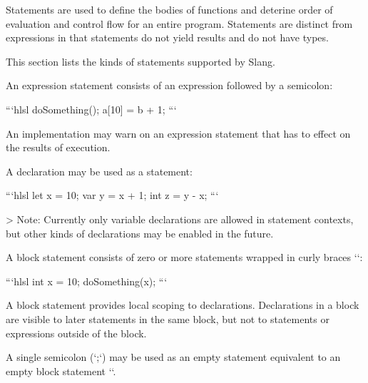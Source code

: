 
Statements are used to define the bodies of functions and deterine order of evaluation and control flow for an entire program.
Statements are distinct from expressions in that statements do not yield results and do not have types.

This section lists the kinds of statements supported by Slang.


An expression statement consists of an expression followed by a semicolon:

```hlsl
doSomething();
a[10] = b + 1;
```

An implementation may warn on an expression statement that has to effect on the results of execution.


A declaration may be used as a statement:

```hlsl
let x = 10;
var y = x + 1;
int z = y - x;
```

> Note: Currently only variable declarations are allowed in statement contexts, but other kinds of declarations may be enabled in the future.


A block statement consists of zero or more statements wrapped in curly braces `{}`:

```hlsl
{
	int x = 10;
	doSomething(x);
}
```

A block statement provides local scoping to declarations.
Declarations in a block are visible to later statements in the same block, but not to statements or expressions outside of the block.


A single semicolon (`;`) may be used as an empty statement equivalent to an empty block statement `{}`.



